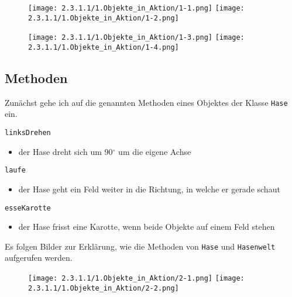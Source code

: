 \documentclass[]{scrartcl}   %
\begin{document}
\vspace{0.3cm}

\begin{figure}[ht]
	\centering
	\texttt{[image: 2.3.1.1/1.Objekte\_in\_Aktion/1-1.png]}
	\hspace{0.5cm}
	\texttt{[image: 2.3.1.1/1.Objekte\_in\_Aktion/1-2.png]}
\end{figure}

\vspace{0.5cm}

\begin{figure}[ht]
	\centering
	\texttt{[image: 2.3.1.1/1.Objekte\_in\_Aktion/1-3.png]}
	\hspace{0.5cm}
	\texttt{[image: 2.3.1.1/1.Objekte\_in\_Aktion/1-4.png]}
\end{figure}

\subsection{Methoden}
Zunächst gehe ich auf die genannten Methoden eines Objektes der Klasse \texttt{Hase} ein.

\begin{itemize}
    \barrow \texttt{linksDrehen}
    \begin{itemize}
    \item der Hase dreht sich um 90$^{\circ}$ um die eigene Achse
    \end{itemize}
    \barrow \texttt{laufe}
    \begin{itemize}
    \item der Hase geht ein Feld weiter in die Richtung, in welche er gerade schaut
    \end{itemize}
    \barrow \texttt{esseKarotte}
    \begin{itemize}
    \item der Hase frisst eine Karotte, wenn beide Objekte auf einem Feld stehen
    \end{itemize}
\end{itemize}

Es folgen Bilder zur Erklärung, wie die Methoden von \texttt{Hase} und \texttt{Hasenwelt} aufgerufen werden.

\begin{figure}[ht]
	\centering
	\texttt{[image: 2.3.1.1/1.Objekte\_in\_Aktion/2-1.png]}
	\hspace{0.5cm}
	\texttt{[image: 2.3.1.1/1.Objekte\_in\_Aktion/2-2.png]}
\end{figure}
\end{document}
